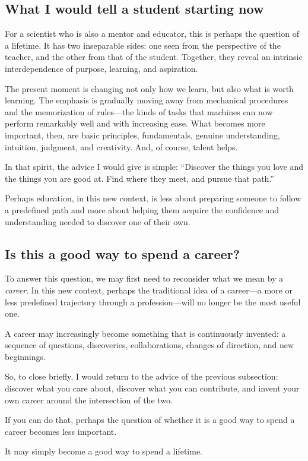 \subsection{What I would tell a student starting now}

For a scientist who is also a mentor and educator, this is perhaps the question of a lifetime. It has two inseparable sides: one seen from the perspective of the teacher, and the other from that of the student. Together, they reveal an intrinsic interdependence of purpose, learning, and aspiration.

The present moment is changing not only how we learn, but also what is worth learning. The emphasis is gradually moving away from mechanical procedures and the memorization of rules---the kinds of tasks that machines can now perform remarkably well and with increasing ease. What becomes more important, then, are basic principles, fundamentals, genuine understanding, intuition, judgment, and creativity. And, of course, talent helps.

In that spirit, the advice I would give is simple: ``Discover the things you love and the things you are good at. Find where they meet, and pursue that path.''

Perhaps education, in this new context, is less about preparing someone to follow a predefined path and more about helping them acquire the confidence and understanding needed to discover one of their own.

\subsection{Is this a good way to spend a career?}

To answer this question, we may first need to reconsider what we mean by a \textit{career}. In this new context, perhaps the traditional idea of a career---a more or less predefined trajectory through a profession---will no longer be the most useful one.

A career may increasingly become something that is continuously invented: a sequence of questions, discoveries, collaborations, changes of direction, and new beginnings.

So, to close briefly, I would return to the advice of the previous subsection: discover what you care about, discover what you can contribute, and invent your own career around the intersection of the two.

If you can do that, perhaps the question of whether it is a good way to spend a career becomes less important.

It may simply become a good way to spend a lifetime.
